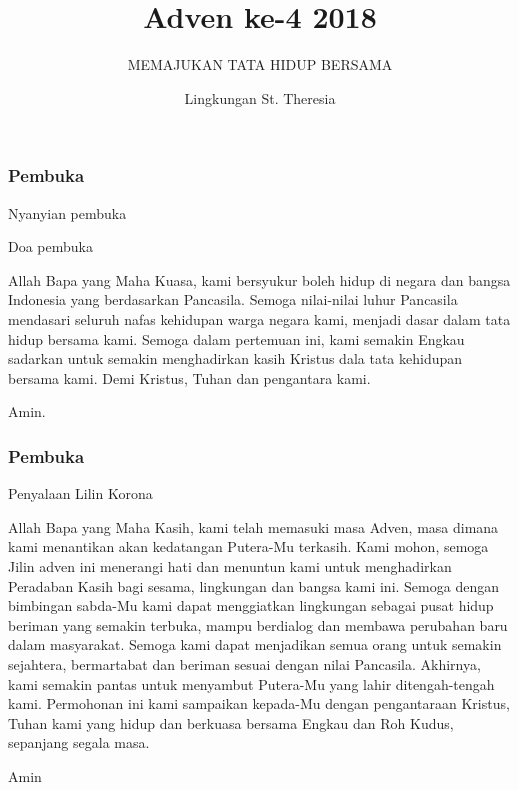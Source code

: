 \documentclass[11pt]{beamer}
\begin{document}
	\author{Lingkungan St. Theresia}
	\subtitle{MEMAJUKAN TATA HIDUP BERSAMA}
	\title{Adven ke-4 2018}
	\frame[plain]{\maketitle}
	
	\begin{frame}
		\transboxin
		\frametitle{Pembuka}
	 	\begin{block}{Nyanyian pembuka}
	 	\end{block}	
 	\pause
	 	\begin{block}{Doa pembuka}
	 	
	 	
	 	Allah Bapa yang Maha Kuasa, kami bersyukur boleh hidup di negara dan bangsa Indonesia
	 	yang berdasarkan Pancasila. Semoga nilai-nilai luhur Pancasila mendasari seluruh nafas
	 	kehidupan warga negara kami, menjadi dasar dalam tata hidup bersama kami. Semoga
	 	dalam pertemuan ini, kami semakin Engkau sadarkan untuk semakin menghadirkan kasih
	 	Kristus dala tata kehidupan bersama kami. Demi Kristus, Tuhan dan pengantara kami.
	 	
	 	 Amin.
	 	\end{block}	
	 	
	\end{frame}

	\begin{frame}
		\frametitle{Pembuka}
	\begin{block}{Penyalaan Lilin Korona}
		
		\small Allah Bapa yang Maha Kasih, kami telah memasuki masa Adven, masa dimana kami
		menantikan akan kedatangan Putera-Mu terkasih. Kami mohon, semoga Jilin adven ini
		menerangi hati dan menuntun kami untuk menghadirkan Peradaban Kasih bagi sesama,
		lingkungan dan bangsa kami ini. Semoga dengan bimbingan sabda-Mu kami dapat
		menggiatkan lingkungan sebagai pusat hidup beriman yang semakin terbuka, mampu
		berdialog dan membawa perubahan baru dalam masyarakat. Semoga kami dapat
		menjadikan semua orang untuk semakin sejahtera, bermartabat dan beriman sesuai dengan
		nilai Pancasila. Akhirnya, kami semakin pantas untuk menyambut Putera-Mu yang lahir ditengah-tengah kami. Permohonan ini kami sampaikan kepada-Mu dengan pengantaraan
		Kristus, Tuhan kami yang hidup dan berkuasa bersama Engkau dan Roh Kudus, sepanjang
		segala masa.
		
		Amin
	\end{block}
\end{frame}
\end{document}
